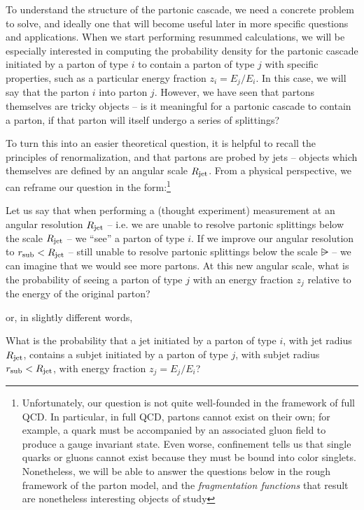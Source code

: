 To understand the structure of the partonic cascade, we need a concrete problem to solve, and ideally one that will become useful later in more specific questions and applications.
%
When we start performing resummed calculations, we will be especially interested in computing the probability density for the partonic cascade initiated by a parton of type \(i\) to contain a parton of type \(j\) with specific properties, such as a particular energy fraction \(z_i = E_j/E_i\).
%
In this case, we will say that the parton \(i\)  into parton \(j\).
%
However, we have seen that partons themselves are tricky objects -- is it meaningful for a partonic cascade to contain a parton, if that parton will itself undergo a series of splittings?


To turn this into an easier theoretical question, it is helpful to recall the principles of renormalization, and that partons are probed by jets -- objects which themselves are defined by an angular scale \(R_\text{jet}\).
%
From a physical perspective, we can reframe our question in the form:\footnote{
    Unfortunately, our question is not quite well-founded in the framework of full QCD.
    In particular, in full QCD, partons cannot exist on their own;
    for example, a quark must be accompanied by an associated gluon field to produce a gauge invariant state.
    Even worse, confinement tells us that single quarks or gluons cannot exist because they must be bound into color singlets.
    Nonetheless, we will be able to answer the questions below in the rough framework of the parton model, and the \textit{fragmentation functions} that result are nonetheless interesting objects of study
}
\begin{question*}{}{}
    Let us say that when performing a (thought experiment) measurement at an angular resolution \(R_\text{jet}\) -- i.e. we are unable to resolve partonic splittings below the scale \(R_\text{jet}\) -- we ``see'' a parton of type \(i\).
    If we improve our angular resolution to \(r_\text{sub} < R_\text{jet}\) -- still unable to resolve partonic splittings below the scale \(\rsub\) -- we can imagine that we would see more partons.
    At this new angular scale, what is the probability of seeing a parton of type \(j\) with an energy fraction \(z_j\) relative to the energy of the original parton?
\end{question*}
%
\noindent
or, in slightly different words,
%
\begin{question*}{}{}
    What is the probability that a jet initiated by a parton of type \(i\), with jet radius \(R_\text{jet}\), contains a subjet initiated by a parton of type \(j\), with subjet radius \(r_\text{sub} < R_\text{jet}\), with energy fraction \(z_j = E_j / E_i\)?
\end{question*}

